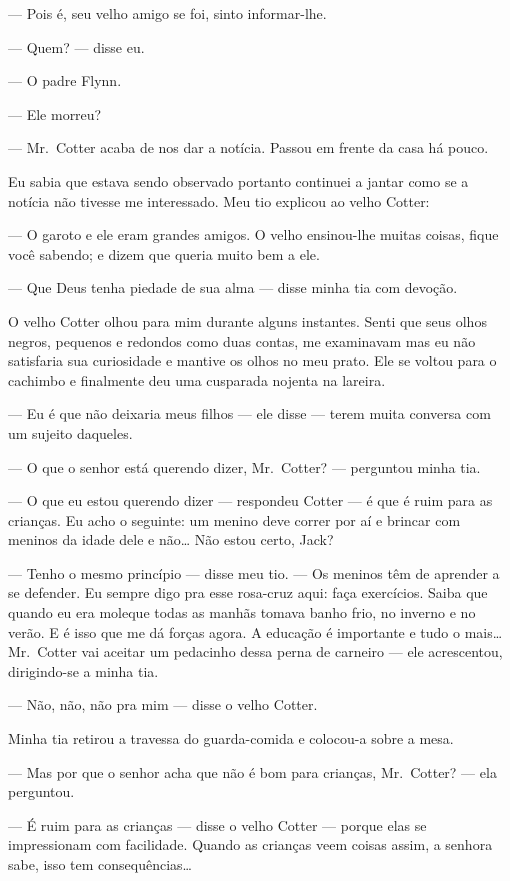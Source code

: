 --- Pois é, seu velho amigo se foi, sinto informar-lhe.

--- Quem? --- disse eu.

--- O padre Flynn.

--- Ele morreu?

--- Mr.~Cotter acaba de nos dar a notícia.  Passou em frente da casa há pouco.

Eu sabia que estava sendo observado portanto continuei a jantar como se a
notícia não tivesse me interessado.  Meu tio explicou ao velho Cotter:

--- O garoto e ele eram grandes amigos.  O velho ensinou-lhe muitas coisas,
fique você sabendo; e dizem que queria muito bem a ele.

--- Que Deus tenha piedade de sua alma --- disse minha tia com devoção.

O velho Cotter olhou para mim durante alguns instantes.  Senti que seus olhos
negros, pequenos e redondos como duas contas, me examinavam mas eu não
satisfaria sua curiosidade e mantive os olhos no meu prato.  Ele se voltou para
o cachimbo e finalmente deu uma cusparada nojenta na lareira.

--- Eu é que não deixaria meus filhos --- ele disse --- terem muita conversa
com um sujeito daqueles.

--- O que o senhor está querendo dizer, Mr.~Cotter? --- perguntou minha tia.

--- O que eu estou querendo dizer --- respondeu Cotter --- é que é ruim
para as crianças.  Eu acho o seguinte: um menino deve correr por aí e brincar
com meninos da idade dele e não\ldots{} Não estou certo, Jack?

--- Tenho o mesmo princípio --- disse meu tio.  --- Os meninos têm de aprender
a se defender.  Eu sempre digo pra esse rosa-cruz aqui: faça exercícios.  Saiba
que quando eu era moleque todas as manhãs tomava banho frio, no inverno e no
verão.  E é isso que me dá forças agora.  A educação é importante e tudo o
mais\ldots{} Mr.~Cotter vai aceitar um pedacinho dessa perna de carneiro ---
ele acrescentou, dirigindo-se a minha tia.

--- Não, não, não pra mim --- disse o velho Cotter.

Minha tia retirou a travessa do guarda-comida e colocou-a sobre a mesa.

--- Mas por que o senhor acha que não é bom para crianças, Mr.~Cotter?  ---
ela perguntou.

--- É ruim para as crianças --- disse o velho Cotter --- porque elas se
impressionam com facilidade.  Quando as crianças veem coisas assim, a senhora
sabe, isso tem consequências\ldots{}

